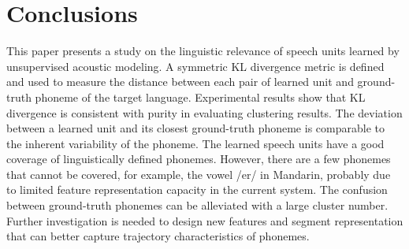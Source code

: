 \documentclass[a4paper]{article}
\begin{document}


\section{Conclusions}
This paper presents a study on the linguistic relevance
of speech units learned by unsupervised acoustic modeling. A
symmetric KL divergence metric is defined and used to measure
the distance between each pair of learned unit and ground-truth phoneme of the target language. Experimental results show that KL divergence is consistent with purity in evaluating clustering results. The deviation between a learned unit and its closest ground-truth phoneme is comparable to the inherent variability of the phoneme. The learned speech units have a good coverage of linguistically defined phonemes. However, there are a few phonemes that cannot be covered, for example, the vowel /er/ in Mandarin, probably due to limited feature representation capacity in the current system. The confusion between ground-truth phonemes can be alleviated with a large cluster number. Further investigation is needed to design new features and segment representation that can better capture trajectory characteristics of phonemes.
\end{document}
